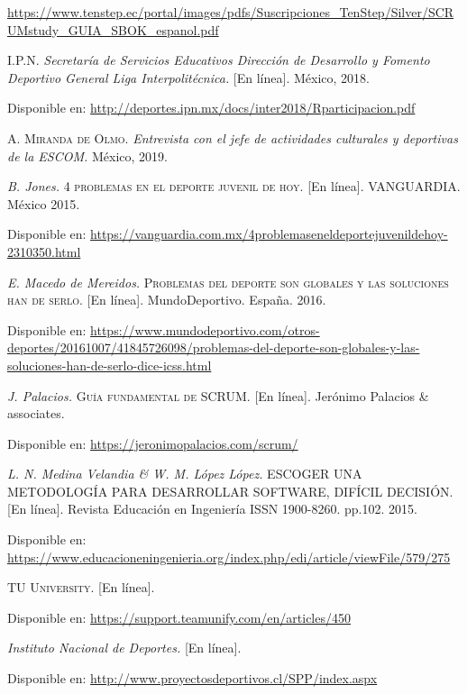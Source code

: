 \begin{thebibliography}{}
        \url{https://www.tenstep.ec/portal/images/pdfs/Suscripciones_TenStep/Silver/SCRUMstudy_GUIA_SBOK_espanol.pdf}
        
			\textsc{I.P.N.}
			\textit{Secretaría de Servicios Educativos Dirección de Desarrollo y Fomento Deportivo General Liga Interpolitécnica.}
	  [En línea]. México, 2018.
		

		Disponible en: 
		\url{http://deportes.ipn.mx/docs/inter2018/Rparticipacion.pdf}

			\textsc{A. Miranda de Olmo.} 
	        \textit{Entrevista con el jefe de actividades culturales y deportivas de la ESCOM.} México, 2019.
	

		\textit{B. Jones.}
		\textsc{4 problemas en el deporte juvenil de hoy.} [En línea].
		 VANGUARDIA. México 2015.
		
		Disponible en: 
		\url{https://vanguardia.com.mx/4problemaseneldeportejuvenildehoy-2310350.html}

		\textit{E. Macedo de Mereidos.}
		\textsc{Problemas del deporte son globales y las soluciones han de serlo.} [En línea]. 
		MundoDeportivo. España. 2016.
		
		Disponible en: 
		\url{https://www.mundodeportivo.com/otros-deportes/20161007/41845726098/problemas-del-deporte-son-globales-y-las-soluciones-han-de-serlo-dice-icss.html}
		
		\textit{J. Palacios.}
		\textsc{Guía fundamental de SCRUM.} [En línea]. 
         Jerónimo Palacios \& associates. 
		
		Disponible en: 
		\url{https://jeronimopalacios.com/scrum/}
		
		\textit{L. N. Medina Velandia \& W. M. López López.}
		\textsc{ESCOGER UNA METODOLOGÍA PARA DESARROLLAR SOFTWARE, DIFÍCIL DECISIÓN.} [En línea]. 
		  Revista Educación en Ingeniería ISSN 1900-8260. pp.102. 2015. 
		
		Disponible en: 
		\url{https://www.educacioneningenieria.org/index.php/edi/article/viewFile/579/275}
		
		\textsc{TU University.}
		[En línea]. 
		
		Disponible en: 
		\url{https://support.teamunify.com/en/articles/450}
		
		\textit{Instituto Nacional de Deportes.}
		\textsc{}[En línea].
		

		Disponible en:
		\url{http://www.proyectosdeportivos.cl/SPP/index.aspx}
	

\end{thebibliography}
